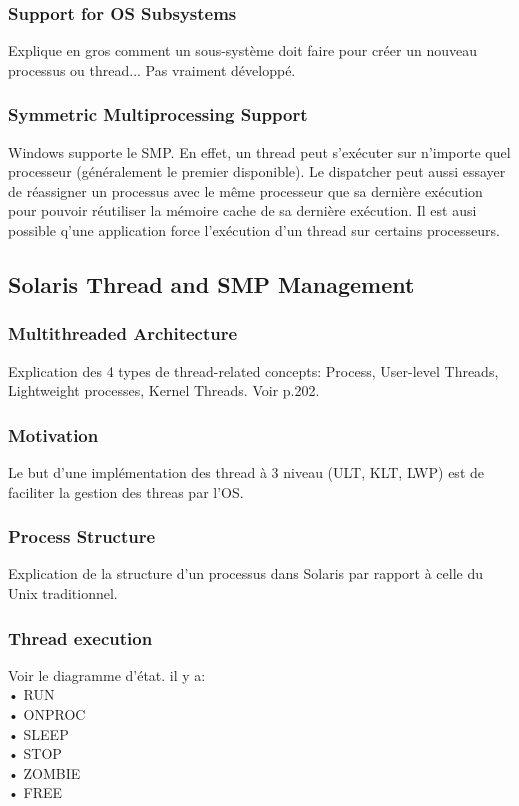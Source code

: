 \subsubsection{Support for OS Subsystems}
Explique en gros comment un sous-système doit faire pour créer un nouveau processus ou thread... Pas vraiment développé.
\subsubsection{Symmetric Multiprocessing Support}
Windows supporte le SMP. En effet, un thread peut s’exécuter sur n’importe quel processeur (généralement le premier disponible). Le dispatcher peut aussi essayer de réassigner un processus avec le même processeur que sa dernière exécution pour pouvoir réutiliser la mémoire cache de sa dernière exécution. Il est ausi possible q’une application force l’exécution d’un thread sur certains processeurs.
\subsection{Solaris Thread and SMP Management }
\subsubsection{Multithreaded Architecture}
Explication des 4 types de thread-related concepts: Process, User-level Threads, Lightweight processes, Kernel Threads. Voir p.202.
\subsubsection{Motivation}
Le but d’une implémentation des thread à 3 niveau (ULT, KLT, LWP) est de faciliter la gestion des threas par l’OS.
\subsubsection{Process Structure}
Explication de la structure d’un processus dans Solaris par rapport à celle du Unix traditionnel.
\subsubsection{Thread execution}
Voir le diagramme d’état. il y a:  \\
• RUN \\
• ONPROC  \\
• SLEEP \\
• STOP \\
• ZOMBIE \\
• FREE\\
